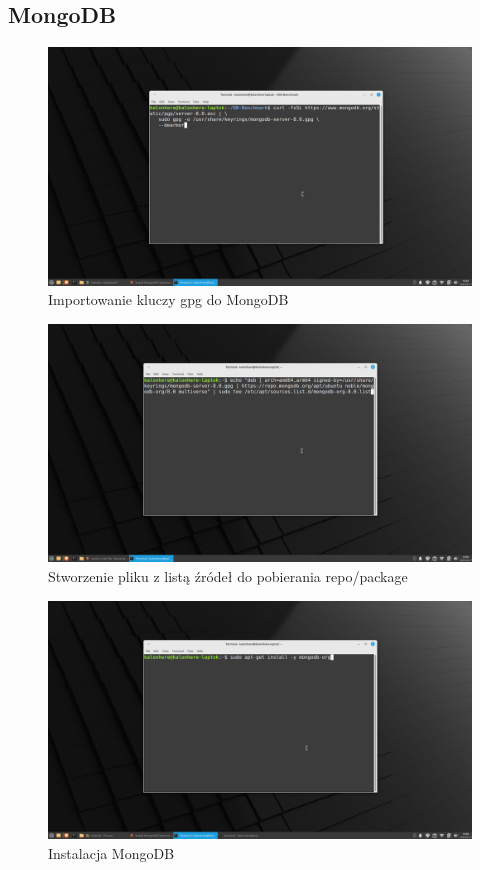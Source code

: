 \documentclass[11pt]{article}
\begin{document}
\newpage
	\subsection{MongoDB}
		\begin{figure}[h]
			\includegraphics[width=\textwidth]{4_importowanie_klucza_gpg.png}
			\caption{Importowanie kluczy gpg do MongoDB}
		\end{figure}
		\begin{figure}[!h]
			\includegraphics[width=\textwidth]{5_tworzenie_pliku_z_listami_source_do_repo.png}
			\caption{Stworzenie pliku z listą źródeł do pobierania repo/package}
		\end{figure}
		\begin{figure}
			\includegraphics[width=\textwidth]{6_instalacja_mongodb.png}
			\caption{Instalacja MongoDB}
		\end{figure}
\end{document}
